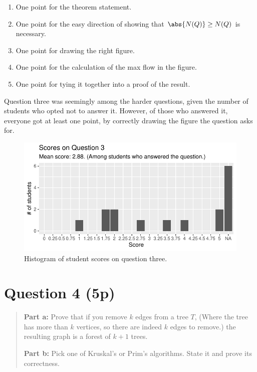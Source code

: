 \documentclass[nobib]{tufte-handout}
\begin{document}
\begin{enumerate}
  \item One point for the theorem statement.
  \item One point for the easy direction of showing that $\abs{N(Q)} \geq N(Q)$ is necessary.
  \item One point for drawing the right figure.
  \item One point for the calculation of the max flow in the figure.
  \item One point for tying it together into a proof of the result.
\end{enumerate}

Question three was seemingly among the harder questions, given the number of students who opted not to answer it. However, of those who answered it, everyone got at least one point, by correctly drawing the figure the question asks for.

\begin{figure}[p]
  \centering
  \includegraphics[width = \textwidth]{Q3.pdf}
  \caption[Score histogram for Q3]{Histogram of student scores on question three.}
  \label{fig:Q3}
\end{figure}

\section{Question 4 (5p)} %
\begin{quotation}
  \textbf{Part a:} Prove that if you remove $k$ edges from a tree $T$, (Where the tree has more than $k$ vertices, so there are indeed $k$ edges to remove.) the resulting graph is a forest of $k+1$ trees.
  \vspace{0.5cm}

  \noindent
  \textbf{Part b:} Pick one of Kruskal's or Prim's algorithms. State it and prove its correctness.
\end{quotation}
\end{document}
